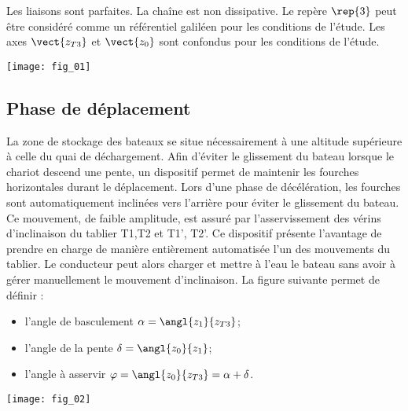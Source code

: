 \begin{multicols}{2}
Les liaisons sont parfaites. La chaîne est non dissipative. Le repère $\rep{3}$ peut être considéré comme un référentiel galiléen pour les conditions de l’étude. Les axes $\vect{z_{T3}}$ et $\vect{z_{0}}$ sont confondus pour les conditions de l’étude.

\begin{center}
\texttt{[image: fig\_01]}
\end{center}

\fi

\ifprof
\begin{corrige}
\end{corrige}
\else
\fi



\subsection*{Phase de déplacement}

\ifprof
\else

La zone de stockage des bateaux se situe nécessairement à une altitude supérieure à celle du quai de déchargement. Afin d’éviter le glissement du bateau lorsque le chariot descend une pente, un dispositif permet de maintenir les fourches horizontales durant le déplacement. Lors d’une phase de décélération, les fourches sont automatiquement inclinées vers l’arrière pour éviter le glissement du bateau. Ce mouvement, de faible amplitude, est assuré par l’asservissement des vérins d’inclinaison du tablier T1,T2 et T1’, T2’. Ce dispositif présente l’avantage de prendre en charge de manière entièrement automatisée l’un des mouvements du tablier. Le conducteur peut alors charger et mettre à l’eau le bateau sans avoir à gérer manuellement le mouvement d’inclinaison.
La figure suivante permet de définir :
\begin{itemize}
\item l'angle de basculement $\alpha=\angl{z_1}{z_{T3}}$;
\item l'angle de la pente $\delta=\angl{z_0}{z_1}$;
\item l'angle à asservir  $\varphi=\angl{z_0}{z_{T3}}=\alpha+\delta$.
\end{itemize}


\begin{center}
\texttt{[image: fig\_02]}
\end{center}
\fi



\end{multicols}
